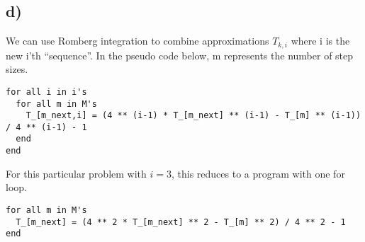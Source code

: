 \documentclass[12pt]{article}
\begin{document}
\subsection*{d)}
We can use Romberg integration to combine approximations $T_{k,i}$ where i is
the new i'th ``sequence''. In the pseudo code below, m represents the number of
step sizes.
\begin{lstlisting}
for all i in i's
  for all m in M's
    T_[m_next,i] = (4 ** (i-1) * T_[m_next] ** (i-1) - T_[m] ** (i-1)) / 4 ** (i-1) - 1
  end
end
\end{lstlisting}
For this particular problem with $i=3$, this reduces to a program with one for loop.
\begin{lstlisting}
for all m in M's
  T_[m_next] = (4 ** 2 * T_[m_next] ** 2 - T_[m] ** 2) / 4 ** 2 - 1
end
\end{lstlisting}
\end{document}
